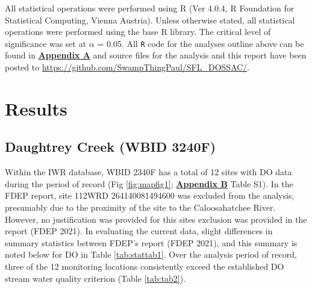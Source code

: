 \documentclass[]{interact}
\theoremstyle{plain}%
\theoremstyle{definition}
\theoremstyle{remark}
\begin{document}
All statistical operations were performed using R (Ver 4.0.4, R
Foundation for Statistical Computing, Vienna Austria). Unless otherwise
stated, all statistical operations were performed using the base R
library. The critical level of significance was set at \(\alpha\) =
0.05. All \texttt{R} code for the analyses outline above can be found in
\textbf{\protect\hyperlink{appendix-a}{Appendix A}} and source files for
the analysis and this report have been posted to
\url{https://github.com/SwampThingPaul/SFL_DOSSAC/}.

\hypertarget{results}{%
\section{Results}\label{results}}

\hypertarget{daughtrey-creek-wbid-3240f}{%
\subsection{Daughtrey Creek (WBID
3240F)}\label{daughtrey-creek-wbid-3240f}}

Within the IWR database, WBID 2340F has a total of 12 sites with DO data
during the period of record (Fig \ref{fig:mapfig1};
\textbf{\protect\hyperlink{appendix-b}{Appendix B}} Table S1). In the
FDEP report, site 112WRD 264140081494600 was excluded from the analysis,
presumably due to the proximity of the site to the Caloosahatchee River.
However, no justification was provided for this sites exclusion was
provided in the report (FDEP 2021). In evaluating the current data,
slight differences in summary statistics between FDEP's report (FDEP
2021), and this summary is noted below for DO in Table
\ref{tab:stattab1}. Over the analysis period of record, three of the 12
monitoring locations consistently exceed the established DO stream water
quality criterion (Table \ref{tab:tab2}).
\end{document}
